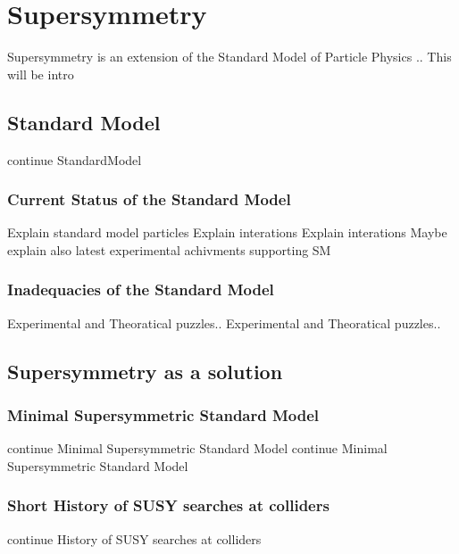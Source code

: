 \chapter{Supersymmetry}
Supersymmetry is an extension of the Standard Model of Particle Physics ..
This will be intro
\newpage
\section{Standard Model}
\label{sec:StandardModel}
\newpage
continue StandardModel
\newpage
\subsection{Current Status of the Standard Model}
Explain standard model particles
\newpage
Explain interations
\newpage
Explain interations
\newpage
Maybe explain also latest experimental achivments supporting SM
\newpage
\subsection{Inadequacies of the Standard Model}
Experimental and Theoratical puzzles..
\newpage
Experimental and Theoratical puzzles..
\newpage
\section{Supersymmetry as a solution}
\newpage
\subsection{Minimal Supersymmetric Standard Model}
\newpage
continue Minimal Supersymmetric Standard Model
\newpage
continue Minimal Supersymmetric Standard Model
\newpage
\subsection{Short History of SUSY searches at colliders}
\newpage
continue History of SUSY searches at colliders
\newpage


